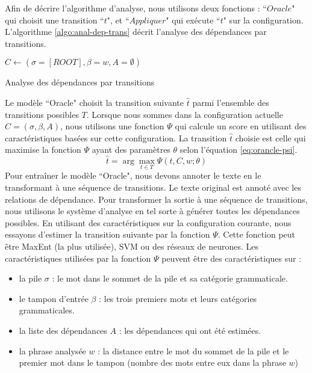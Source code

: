 \documentclass{KodeBook}
\begin{document}
Afin de décrire l'algorithme d'analyse, nous utilisons deux fonctions : ``$Oracle$" qui choisit une transition ``$t$", et ``$Appliquer$" qui exécute ``$t$" sur la configuration. 
L'algorithme \ref{algo:anal-dep-trans} décrit l'analyse des dépendances par transitions.

\begin{algorithm}[ht]
	
	$C \leftarrow (\sigma=[ROOT], \beta = w, A = \emptyset)$\;
	
	
	
	\caption{Analyse des dépendances par transitions \label{algo:anal-dep-trans}}
\end{algorithm}

Le modèle ``Oracle" choisit la transition suivante $\hat{t}$ parmi l'ensemble des transitions possibles $T$.
Lorsque nous sommes dans la configuration actuelle $ C = (\sigma, \beta, A) $, nous utilisons une fonction $\Psi$ qui calcule un score en utilisant des caractéristiques basées sur cette configuration.
La transition $\hat{t}$ choisie est celle qui maximise la fonction $\Psi$ ayant des paramètres $\theta$ selon l'équation \ref{eq:orancle-psi}.
\begin{equation}\label{eq:orancle-psi}
\hat{t} = \arg\max\limits_{t \in T} \Psi (t, C, w; \theta)
\end{equation}
Pour entraîner le modèle ``Oracle", nous devons annoter le texte en le transformant à une séquence de transitions. 
Le texte original est annoté avec les relations de dépendance. 
Pour transformer la sortie à une séquence de transitions, nous utilisons le système d'analyse en tel sorte à générer toutes les dépendances possibles. 
En utilisant des caractéristiques sur la configuration courante, nous essayons d'estimer la transition suivante par la fonction $\Psi$.  
Cette fonction peut être MaxEnt (la plus utilisée), SVM ou des réseaux de neurones. 
Les caractéristiques utilisées par la fonction $\Psi$ peuvent être des caractéristiques sur :  
\begin{itemize}
	\item la pile $\sigma$ : le mot dans le sommet de la pile et sa catégorie grammaticale. 
	\item le tampon d'entrée $\beta$ : les trois premiers mots et leurs catégories grammaticales.
	\item la liste des dépendances $A$ : les dépendances qui ont été estimées.
	\item la phrase analysée $w$ : la distance entre le mot du sommet de la pile et le premier mot dans le tampon (nombre des mots entre eux dans la phrase $w$)
\end{itemize}
\end{document}
